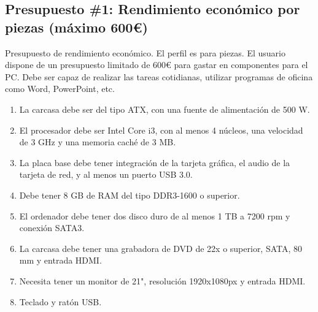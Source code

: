 \documentclass[spanish,openany]{report}
\begin{document}
\subsection*{Presupuesto \#1: Rendimiento económico por piezas (máximo 600\euro)}
Presupuesto de rendimiento económico. El perfil es para piezas. El usuario dispone de un presupuesto limitado de {600\euro}  para gastar en componentes para el PC. Debe ser capaz de realizar las tareas cotidianas, utilizar programas de oficina como Word, PowerPoint, etc.
\begin{enumerate}
	\item{La carcasa debe ser del tipo ATX, con una fuente de alimentación de 500 W.}
	\item{El procesador debe ser Intel Core i3, con al menos 4 núcleos, una velocidad de 3 GHz y una memoria caché de 3 MB.}
	\item{La placa base debe tener integración de la tarjeta gráfica, el audio de la tarjeta de red, y al menos un puerto USB 3.0.}
	\item{Debe tener 8 GB de RAM del tipo DDR3-1600 o superior.}
	\item{El ordenador debe tener dos disco duro de al menos 1 TB a 7200 rpm y conexión SATA3.}
	\item{La carcasa debe tener una grabadora de DVD de 22x o superior, SATA, 80 mm y entrada HDMI.}
	\item{Necesita tener un monitor de 21", resolución 1920x1080px y entrada HDMI.}
	\item{Teclado y ratón USB.}
\end{enumerate}
\vspace{3em}
\end{document}
